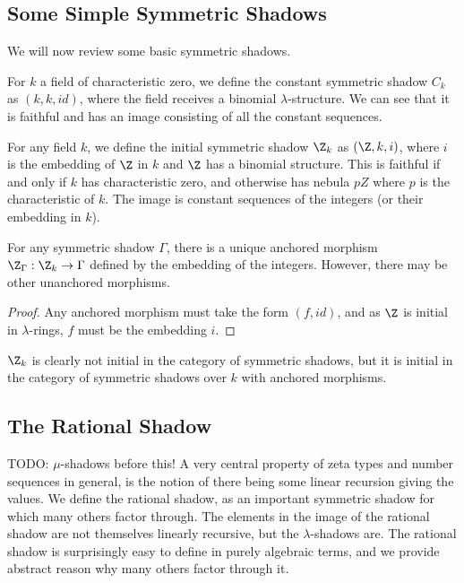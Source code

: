 \subsection{Some Simple Symmetric Shadows}
We will now review some basic symmetric shadows.

\begin{definition}
  For $k$ a field of characteristic zero, we define the constant symmetric shadow $C_k$ as $(k, k, id)$, where the field receives a binomial $\lambda$-structure. We can see that it is faithful and has an image consisting of all the constant sequences.
\end{definition}

\begin{definition}
  For any field $k$, we define the initial symmetric shadow $\Z_k$ as $(\Z, k, i)$, where $i$ is the embedding of $\Z$ in $k$ and $\Z$ has a binomial structure. This is faithful if and only if $k$ has characteristic zero, and otherwise has nebula $pZ$ where $p$ is the characteristic of $k$. The image is constant sequences of the integers (or their embedding in $k$). 
\end{definition}

\begin{proposition}
  For any symmetric shadow $\Gamma$, there is a unique anchored morphism $\Z_\Gamma : \Z_k \to \Gamma$ defined by the embedding of the integers. However, there may be other unanchored morphisms.
\end{proposition}

\begin{proof}
  Any anchored morphism must take the form $(f, id)$, and as $\Z$ is initial in $\lambda$-rings, $f$ must be the embedding $i$. 
\end{proof}

\begin{remark}
  $\Z_k$ is clearly not initial in the category of symmetric shadows, but it is initial in the category of symmetric shadows over $k$ with anchored morphisms.
\end{remark}

\subsection{The Rational Shadow}
TODO: $\mu$-shadows before this!
A very central property of zeta types and number sequences in general, is the notion of there being some linear recursion giving the values. We define the rational shadow, as an important symmetric shadow for which many others factor through. The elements in the image of the rational shadow are not themselves linearly recursive, but the $\lambda$-shadows are. The rational shadow is surprisingly easy to define in purely algebraic terms, and we provide abstract reason why many others factor through it. 

